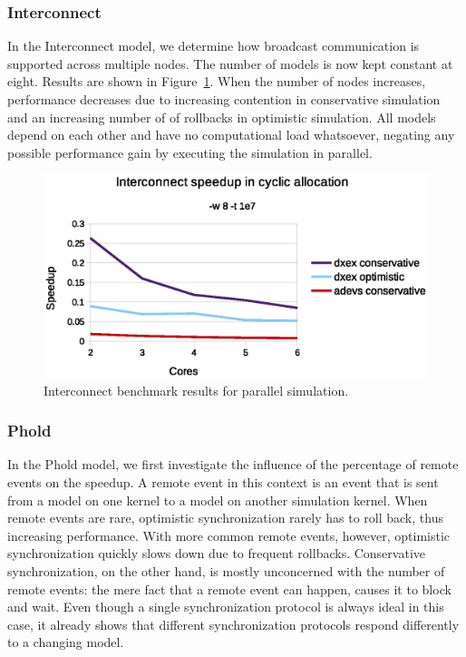 \subsubsection{Interconnect}\label{subsec:parallelinterconnect}
In the Interconnect model, we determine how broadcast communication is supported across multiple nodes.
The number of models is now kept constant at eight.
Results are shown in Figure~\ref{fig:interconnect_benchmark_parallel}.
When the number of nodes increases, performance decreases due to increasing contention in conservative simulation and an increasing number of of rollbacks in optimistic simulation.
All models depend on each other and have no computational load whatsoever, negating any possible performance gain by executing the simulation in parallel.

\begin{figure}
	\center
	\includegraphics[width=\columnwidth]{fig/interconnect_parallel.eps}
	\caption{Interconnect benchmark results for parallel simulation.}
	\label{fig:interconnect_benchmark_parallel}
\end{figure}

\subsubsection{Phold}
In the Phold model, we first investigate the influence of the percentage of remote events on the speedup. A remote event in this context is an event that is sent from a model on one kernel to a model on another simulation kernel.
When remote events are rare, optimistic synchronization rarely has to roll back, thus increasing performance.
With more common remote events, however, optimistic synchronization quickly slows down due to frequent rollbacks.
Conservative synchronization, on the other hand, is mostly unconcerned with the number of remote events: the mere fact that a remote event can happen, causes it to block and wait.
Even though a single synchronization protocol is always ideal in this case, it already shows that different synchronization protocols respond differently to a changing model.

